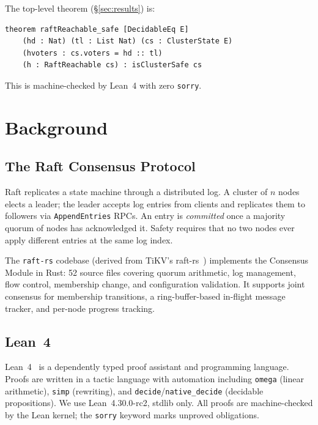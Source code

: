 \documentclass[sigconf,10pt]{acmart}
\begin{document}
The top-level theorem (\S\ref{sec:results}) is:
\begin{lstlisting}[language=Lean4]
theorem raftReachable_safe [DecidableEq E]
    (hd : Nat) (tl : List Nat) (cs : ClusterState E)
    (hvoters : cs.voters = hd :: tl)
    (h : RaftReachable cs) : isClusterSafe cs
\end{lstlisting}

This is machine-checked by Lean~4 with zero \texttt{sorry}.

\section{Background}

\subsection{The Raft Consensus Protocol}

Raft replicates a state machine through a distributed log.  A cluster of $n$
nodes elects a leader; the leader accepts log entries from clients and
replicates them to followers via \texttt{AppendEntries} RPCs.  An entry is
\emph{committed} once a majority quorum of nodes has acknowledged it.
Safety requires that no two nodes ever apply different entries at the same
log index.

The \texttt{raft-rs} codebase (derived from TiKV's raft-rs~\cite{raftrs})
implements the Consensus Module in Rust: 52 source files covering quorum
arithmetic, log management, flow control, membership change, and configuration
validation.  It supports joint consensus for membership transitions, a
ring-buffer-based in-flight message tracker, and per-node progress tracking.

\subsection{Lean~4}

Lean~4~\cite{lean4} is a dependently typed proof assistant and programming
language.  Proofs are written in a tactic language with automation including
\texttt{omega} (linear arithmetic), \texttt{simp} (rewriting), and
\texttt{decide}/\texttt{native\_decide} (decidable propositions).
We use Lean~4.30.0-rc2, stdlib only.  All proofs are machine-checked by
the Lean kernel; the \texttt{sorry} keyword marks unproved obligations.
\end{document}
